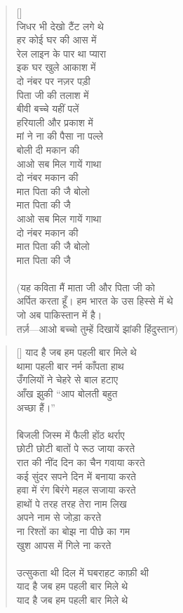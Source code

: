 \begin{verse}[\versewidth]
{\\
जिधर भी देखो टैंट लगे थे\\
हर कोई घर की आस में\\
रेल लाइन के पार था प्यारा\\
इक घर खुले आकाश में\\
दो नंबर पर नज़र पड़ी\\
पिता जी की तलाश में\\
बीवी बच्चे यहीं पलें\\
हरियाली और प्रकाश में\\
मां ने ना की पैसा ना पल्ले\\
बोली दी मकान की\\
आओ सब मिल गायें गाथा\\
दो नंबर मकान की\\
मात पिता की जै बोलो\\
मात पिता की जै\\
आओ सब मिल गायें गाथा\\
दो नंबर मकान की\\
मात पिता की जै बोलो\\
मात पिता की जै\\
\\
(यह कविता मैं माता जी और पिता जी को\\
अर्पित करता हूँ। हम भारत के उस हिस्से में थे\\
जो अब पाकिस्तान में है।\\
तर्ज़—आओ बच्चो तुम्हें दिखायें झांकी हिंदुस्तान)
}
\end{verse}

\begin{verse}[\versewidth]\texthindi{
याद है जब हम पहली बार मिले थे\\
थामा पहली बार नर्म काँपता हाथ\\
उँगलियों ने चेहरे से बाल हटाए\\
आँख झुकी “आप बोलती बहुत\\
अच्छा हैं।”\\
\\
बिजली जिस्म में फैली होंठ थर्राए\\
छोटी छोटी बातों पे रूठ जाया करते\\
रात की नींद दिन का चैन गवाया करते\\
कई सुंदर सपने दिन में बनाया करते\\
हवा में रंग बिरंगे महल सजाया करते\\
हाथों पे तरह तरह तेरा नाम लिख\\
अपने नाम से जोड़ा करते\\
ना रिश्तों का बोझ ना पीछे का गम\\
खुश आपस में गिले ना करते\\
\\
उत्सुकता थी दिल में घबराहट काफ़ी थी\\
याद है जब हम पहली बार मिले थे\\
याद है जब हम पहली बार मिले थे
}
\end{verse}


